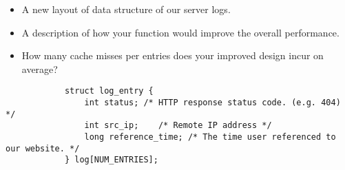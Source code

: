 \begin{questions}
\begin{itemize}
    \item A new layout of data structure of our server logs.
    \item A description of how your function would improve the
    overall performance.
    \item How many cache misses per entries does your improved
    design incur on average?
\end{itemize}

{
    \begin{solution}
        \begin{verbatim}
            struct log_entry {
                int status; /* HTTP response status code. (e.g. 404) */
                int src_ip;    /* Remote IP address */
                long reference_time; /* The time user referenced to our website. */
            } log[NUM_ENTRIES];
        \end{verbatim}
        \vspace{4in}
    \end{solution}
}

\end{questions}